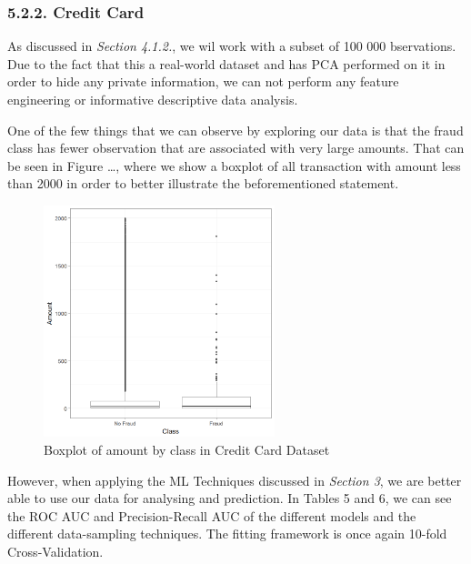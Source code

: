 \documentclass[12pt,]{article}
\begin{document}
\hypertarget{credit-card}{%
\subsubsection{5.2.2. Credit Card}\label{credit-card}}

As discussed in \emph{Section 4.1.2.}, we wil work with a subset of 100
000 bservations. Due to the fact that this a real-world dataset and has
PCA performed on it in order to hide any private information, we can not
perform any feature engineering or informative descriptive data
analysis.

One of the few things that we can observe by exploring our data is that
the fraud class has fewer observation that are associated with very
large amounts. That can be seen in Figure \ldots{}, where we show a
boxplot of all transaction with amount less than 2000 in order to better
illustrate the beforementioned statement.

\begin{figure}
\centering
\includegraphics[width=0.6\textwidth,height=\textheight]{figures/credit/descriptive/cr_card_fraud_amount_boxplot.png}
\caption{Boxplot of amount by class in Credit Card Dataset}
\end{figure}

However, when applying the ML Techniques discussed in \emph{Section 3},
we are better able to use our data for analysing and prediction. In
Tables 5 and 6, we can see the ROC AUC and Precision-Recall AUC of the
different models and the different data-sampling techniques. The fitting
framework is once again 10-fold Cross-Validation.
\end{document}
